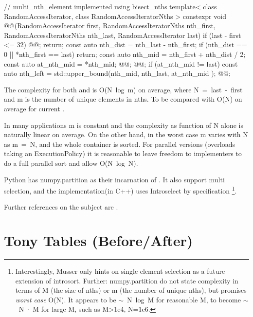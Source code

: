 \begin{codeblock}
// multi_nth_element implemented using bisect_nths
template< class RandomAccessIterator, class RandomAccessIteratorNths >
constexpr void @@(RandomAccessIterator first, 
  RandomAccessIteratorNths nth_first, RandomAccessIteratorNths nth_last, 
  RandomAccessIterator last){
  if (last - first <= 32) { @@; return; }
  const auto nth_dist = nth_last - nth_first;
  if (nth_dist == 0 || *nth_first == last) return;
  const auto nth_mid = nth_first + nth_dist / 2;
  const auto at_nth_mid = *nth_mid;
  @@;
  @@;
  if (at_nth_mid != last){
    const auto nth_left = std::upper_bound(nth_mid, nth_last, at_nth_mid );
    @@;
  }
}
\end{codeblock}


The complexity for both  and  is \mbox{O(N log m)} on average, where \mbox{N = last - first} and m is the number of unique elements in nths. To be compared with \mbox{O(N)} on average for current . 

In many applications m is constant and the complexity as function of N alone is naturally linear on average. On the other hand, in the worst case m varies with N as \mbox{m = N}, and the whole container is sorted. For parallel versions (overloads taking an ExecutionPolicy) it is reasonable to leave freedom to implementers to do a full parallel sort and allow \mbox{O(N log N)}.

Python has numpy.partition\cite{NpPart} as their incarnation of . 
It also support multi selection, and the implementation\cite{NPImpl}(in C++) uses \mbox{Introselect\cite{Musser1997}} by specification%
\footnote{Interestingly, Musser only hints on single element selection as a future extension of introsort. 
Further: numpy.partition do not state complexity in terms of M (the size of nths) or m (the number of unique nths), 
but promises \emph{worst case} O(N). It appears to be \mbox{$\sim$ N log M} for reasonable M, 
to become \mbox{$\sim$ N $\cdot$ M} for large M, such as M>1e4, N=1e6. }.

Further references on the subject are \cite{Kaligosi2006,Panh2002}.

\newpage
\section{Tony Tables (Before/After)}

